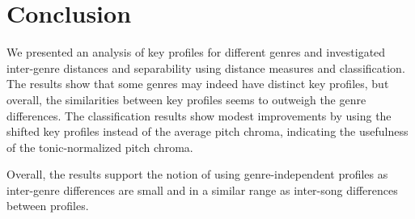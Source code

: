 \documentclass{article}
\begin{document}


\section{Conclusion}
We presented an analysis of key profiles for different genres and investigated inter-genre distances and separability using distance measures and classification. The results show that some genres may indeed have distinct key profiles, but overall, the similarities between key profiles seems to outweigh the genre differences. The classification results show modest improvements by using the shifted key profiles instead of the average pitch chroma, indicating the usefulness of the tonic-normalized pitch chroma. %

Overall, the results support the notion of using genre-indepen\-dent profiles as inter-genre differences are small and in a similar range as inter-song differences between profiles. 
\end{document}

